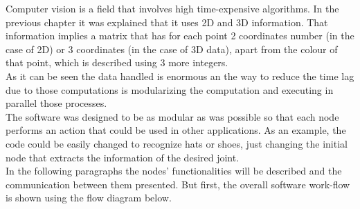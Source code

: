 Computer vision is a field that involves high time-expensive algorithms. In the previous chapter it was explained that it uses 2D and 3D information. That information implies a matrix that has for each point 2 coordinates number (in the case of 2D) or 3 coordinates (in the case of 3D data), apart from the colour of that point, which is described using 3 more integers. \\

As it can be seen the data handled is enormous an the way to reduce the time lag due to those computations is modularizing the computation and executing in parallel those processes. 
\\

The software was designed to be as modular as was possible so that each node performs an action that could be used in other applications. 
As an example, the code could be easily changed to recognize hats or shoes, just changing the initial node that extracts the information of the desired joint. 
\\

In the following paragraphs the nodes' functionalities will be described and the communication between them presented. But first, the overall software work-flow is shown using the flow diagram below. 
\newpage



\newpage

 
\newpage


\newpage


\newpage


